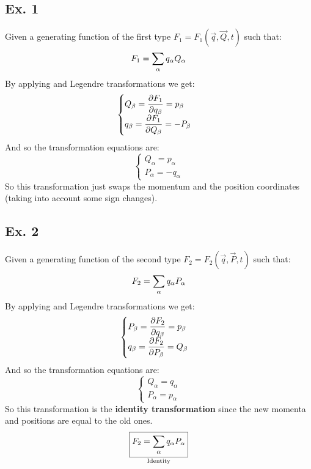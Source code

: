\subsection{Ex. 1}
Given a generating function of the first type $F_1 = F_1(\vec{q},\vec{Q},t)$ such that:
\begin{equation}
    F_1 = \displaystyle\sum_{\alpha} q_{\alpha}Q_{\alpha}
\end{equation}
By applying \hamiltonref\;and Legendre transformations we get:
\begin{equation}
    \begin{cases}
        Q_{\beta} = \pdv{F_1}{q_{\beta}} = p_{\beta}\\
        q_{\beta} = \pdv{F_1}{Q_{\beta}} = -P_{\beta}
    \end{cases}
\end{equation}
And so the transformation equations are:
\begin{equation}
    \begin{cases}
        Q_{\alpha} = p_{\alpha}\\
        P_{\alpha} = -q_{\alpha}
    \end{cases}
\end{equation}
So this transformation just swaps the momentum and the position coordinates (taking into account some sign changes).
\subsection{Ex. 2}
Given a generating function of the second type $F_2 = F_2(\vec{q},\vec{P},t)$ such that:
\begin{equation}
    F_2 = \displaystyle\sum_{\alpha} q_{\alpha}P_{\alpha}
\end{equation}
By applying \hamiltonref\;and Legendre transformations we get:
\begin{equation}
    \begin{cases}
        P_{\beta} = \pdv{F_2}{q_{\beta}} = p_{\beta}\\
        q_{\beta} = \pdv{F_2}{P_{\beta}} = Q_{\beta}
    \end{cases}
\end{equation}
And so the transformation equations are:
\begin{equation}
    \begin{cases}
        Q_{\alpha} = q_{\alpha}\\
        P_{\alpha} = p_{\alpha}
    \end{cases}
\end{equation}
So this transformation is the \textbf{identity transformation} since the new momenta and positions are equal to the old ones.
\begin{equation}
    \underset{\text{Identity}}{\boxed{F_2 = \displaystyle\sum_{\alpha} q_{\alpha}P_{\alpha}}}
\end{equation}
